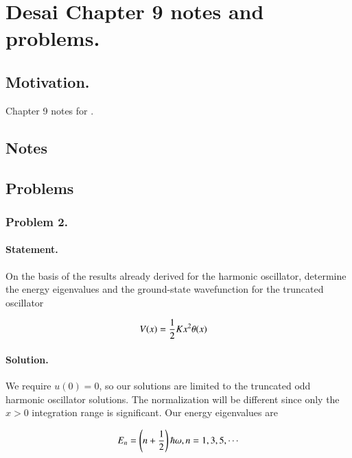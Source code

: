 %
%

\chapter{Desai Chapter 9 notes and problems.}
\label{chap:desaiCh9}
{}
\date{Nov 19, 2010}

\beginArtWithToc

\section{Motivation.}

Chapter 9 notes for \cite{desai2009quantum}.

\section{Notes}
\section{Problems}

\subsection{Problem 2.}
\subsubsection{Statement.}

On the basis of the results already derived for the harmonic oscillator, determine the energy eigenvalues and the ground-state wavefunction for the truncated oscillator

\begin{align*}
V(x) &= \frac{1}{2} K x^2 \theta(x)
\end{align*}

\subsubsection{Solution.}

We require $u(0) = 0$, so our solutions are limited to the truncated odd harmonic oscillator solutions.  The normalization will be different since only the $x>0$ integration range is significant.  Our energy eigenvalues are

\begin{align}\label{eqn:desaiCh9:200}
E_n = \left( n + \frac{1}{2} \right) \hbar \omega, n = 1, 3, 5, \cdots
\end{align}

